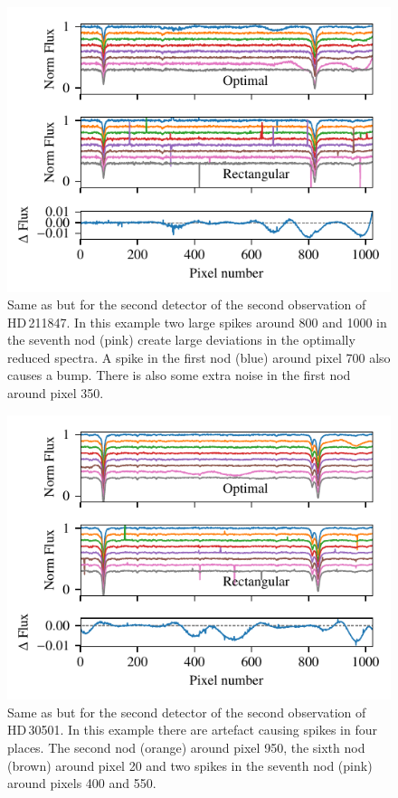   \begin{figure}
     \centering
     \includegraphics[width=0.7\linewidth]{figures/appendix/bp_plots/extraction_comparision_HD211847-2_chip_2}
     \caption{Same as  but for the second detector of the second observation of {HD\,211847}. In this example two large spikes around 800 and 1000 in the seventh nod (pink) create large deviations in the optimally reduced spectra. A spike in the first nod (blue) around pixel 700 also causes a bump. There is also some extra noise in the first nod around pixel 350.}
     \label{fig:artefact_example6}
 \end{figure}
  \begin{figure}
    \centering
    \includegraphics[width=0.7\linewidth]{figures/appendix/bp_plots/extraction_comparision_HD30501-2b_chip_2}
    \caption{Same as  but for the second detector of the second observation of {HD\,30501}. In this example there are artefact causing spikes in four places. The second nod (orange) around pixel 950, the sixth nod (brown) around pixel 20 and two spikes in the seventh nod (pink) around pixels 400 and 550.}
    \label{fig:artefact_example7}
\end{figure}
